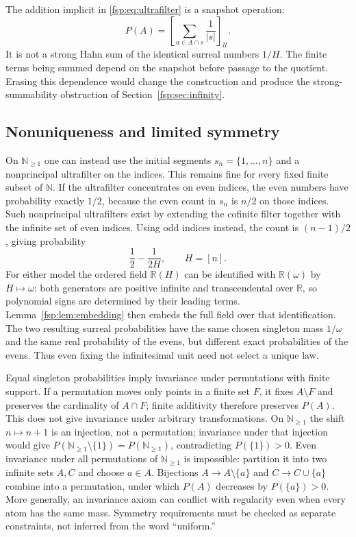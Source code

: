 \documentclass[11pt,a4paper]{article}
\numberwithin{equation}{section}
\theoremstyle{definition}
\theoremstyle{remark}
\newcommand{\R}{\mathbb R}
\newcommand{\N}{\mathbb N}
\begin{document}
The addition implicit in \eqref{fsp:eq:ultrafilter} is a snapshot operation:
\begin{equation}
 P(A)=\left[\sum_{a\in A\cap s}\frac1{|s|}\right]_{\mathcal U}.
\end{equation}
It is not a strong Hahn sum of the identical surreal numbers $1/H$.
The finite terms being summed depend on the snapshot before passage to
the quotient. Erasing this dependence would change the construction and
produce the strong-summability obstruction of Section~\ref{fsp:sec:infinity}.

\subsection{Nonuniqueness and limited symmetry}\label{fsp:sub:nonunique}

On $\N_{\ge1}$ one can instead use the initial segments
$s_n=\{1,\ldots,n\}$ and a nonprincipal ultrafilter on the indices.
This remains fine for every fixed finite subset of $\N$. If the
ultrafilter concentrates on even indices, the even numbers have
probability exactly $1/2$, because the even count in $s_n$ is $n/2$
on those indices. Such nonprincipal ultrafilters exist by extending the
cofinite filter together with the infinite set of even indices.
Using odd indices instead, the count is $(n-1)/2$, giving probability
\begin{equation}
 \frac12-\frac{1}{2H},\qquad H=[n].
\end{equation}
For either model the ordered field $\R(H)$ can be identified with
$\R(\omega)$ by $H\mapsto\omega$: both generators are positive
infinite and transcendental over $\R$, so polynomial signs are determined
by their leading terms. Lemma~\ref{fsp:lem:embedding} then embeds the full
field over that identification. The two resulting surreal probabilities
have the same chosen singleton mass $1/\omega$ and the same real
probability of the evens, but different exact probabilities of the evens.
Thus even fixing the infinitesimal unit need not select a unique law.

Equal singleton probabilities imply invariance under permutations with
finite support. If a permutation moves only points in a finite set $F$,
it fixes $A\setminus F$ and preserves the cardinality of $A\cap F$;
finite additivity therefore preserves $P(A)$. This does not give invariance
under arbitrary transformations. On $\N_{\ge1}$ the shift
$n\mapsto n+1$ is an injection, not a permutation; invariance under
that injection would give
$P(\N_{\ge1}\setminus\{1\})=P(\N_{\ge1})$,
contradicting $P(\{1\})>0$.
Even invariance under all permutations of $\N_{\ge1}$ is impossible:
partition it into two infinite sets $A,C$ and choose $a\in A$.
Bijections $A\to A\setminus\{a\}$ and
$C\to C\cup\{a\}$ combine into a permutation, under which
$P(A)$ decreases by $P(\{a\})>0$.
More generally, an invariance axiom can conflict with regularity even
when every atom has the same mass. Symmetry requirements must be checked
as separate constraints, not inferred from the word ``uniform.''
\end{document}
